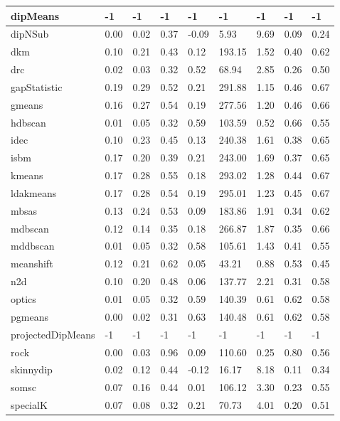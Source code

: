 \begin{table}[H]
\begin{tabular}{|l|l|l|l|l|l|l|l|l|}
\hline
dipMeans & -1 & -1 & -1 & -1 & -1 & -1 & -1 & -1 \\
\hline
dipNSub & 0.00 & 0.02 & 0.37 & -0.09 & 5.93 & 9.69 & 0.09 & 0.24 \\
\hline
dkm & 0.10 & 0.21 & 0.43 & 0.12 & 193.15 & 1.52 & 0.40 & 0.62 \\
\hline
drc & 0.02 & 0.03 & 0.32 & 0.52 & 68.94 & 2.85 & 0.26 & 0.50 \\
\hline
gapStatistic & 0.19 & 0.29 & 0.52 & 0.21 & 291.88 & 1.15 & 0.46 & 0.67 \\
\hline
gmeans & 0.16 & 0.27 & 0.54 & 0.19 & 277.56 & 1.20 & 0.46 & 0.66 \\
\hline
hdbscan & 0.01 & 0.05 & 0.32 & 0.59 & 103.59 & 0.52 & 0.66 & 0.55 \\
\hline
idec & 0.10 & 0.23 & 0.45 & 0.13 & 240.38 & 1.61 & 0.38 & 0.65 \\
\hline
isbm & 0.17 & 0.20 & 0.39 & 0.21 & 243.00 & 1.69 & 0.37 & 0.65 \\
\hline
kmeans & 0.17 & 0.28 & 0.55 & 0.18 & 293.02 & 1.28 & 0.44 & 0.67 \\
\hline
ldakmeans & 0.17 & 0.28 & 0.54 & 0.19 & 295.01 & 1.23 & 0.45 & 0.67 \\
\hline
mbsas & 0.13 & 0.24 & 0.53 & 0.09 & 183.86 & 1.91 & 0.34 & 0.62 \\
\hline
mdbscan & 0.12 & 0.14 & 0.35 & 0.18 & 266.87 & 1.87 & 0.35 & 0.66 \\
\hline
mddbscan & 0.01 & 0.05 & 0.32 & 0.58 & 105.61 & 1.43 & 0.41 & 0.55 \\
\hline
meanshift & 0.12 & 0.21 & 0.62 & 0.05 & 43.21 & 0.88 & 0.53 & 0.45 \\
\hline
n2d & 0.10 & 0.20 & 0.48 & 0.06 & 137.77 & 2.21 & 0.31 & 0.58 \\
\hline
optics & 0.01 & 0.05 & 0.32 & 0.59 & 140.39 & 0.61 & 0.62 & 0.58 \\
\hline
pgmeans & 0.00 & 0.02 & 0.31 & 0.63 & 140.48 & 0.61 & 0.62 & 0.58 \\
\hline
projectedDipMeans & -1 & -1 & -1 & -1 & -1 & -1 & -1 & -1 \\
\hline
rock & 0.00 & 0.03 & 0.96 & 0.09 & 110.60 & 0.25 & 0.80 & 0.56 \\
\hline
skinnydip & 0.02 & 0.12 & 0.44 & -0.12 & 16.17 & 8.18 & 0.11 & 0.34 \\
\hline
somsc & 0.07 & 0.16 & 0.44 & 0.01 & 106.12 & 3.30 & 0.23 & 0.55 \\
\hline
specialK & 0.07 & 0.08 & 0.32 & 0.21 & 70.73 & 4.01 & 0.20 & 0.51 \\

\end{tabular}
\end{table}
